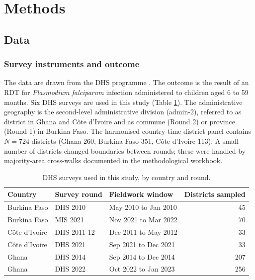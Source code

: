 \documentclass{article}
\begin{document}
\section{Methods}\label{methods}

\label{sec:methods}

\subsection{Data}\label{data}

\subsubsection{Survey instruments and
outcome}\label{survey-instruments-and-outcome}

The data are drawn from the DHS programme \citep{croft2018}. The outcome
is the result of an RDT for \emph{Plasmodium falciparum} infection
administered to children aged 6 to 59 months. Six DHS surveys are used
in this study (Table \ref{tab:surveys}). The administrative geography is
the second-level administrative division (admin-2), referred to as
district in Ghana and Côte d'Ivoire and as commune (Round 2) or province
(Round 1) in Burkina Faso. The harmonised country-time district panel
contains \(N = 724\) districts (Ghana 260, Burkina Faso 351, Côte
d'Ivoire 113). A small number of districts changed boundaries between
rounds; these were handled by majority-area cross-walks documented in
the methodological workbook.

\begingroup\fontsize{8}{10}\selectfont

\begin{longtable}[t]{lllr}
\caption{\label{tab:surveys}DHS surveys used in this study, by country and round. \label{tab:surveys}}\\
\toprule
Country & Survey round & Fieldwork window & Districts sampled\\
\midrule
Burkina Faso & DHS 2010 & May 2010 to Jan 2010 & 45\\
Burkina Faso & MIS 2021 & Nov 2021 to Mar 2022 & 70\\
Côte d'Ivoire & DHS 2011-12 & Dec 2011 to May 2012 & 33\\
Côte d'Ivoire & DHS 2021 & Sep 2021 to Dec 2021 & 33\\
Ghana & DHS 2014 & Sep 2014 to Dec 2014 & 207\\
\addlinespace
Ghana & DHS 2022 & Oct 2022 to Jan 2023 & 256\\
\bottomrule
\end{longtable}
\endgroup{}
\end{document}
